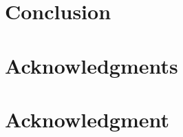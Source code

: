 \documentclass[conference,compsoc]{IEEEtran}
\begin{document}




\section{Conclusion}\label{sec:conclusion}







\ifCLASSOPTIONcompsoc
  \section*{Acknowledgments}
\else
  \section*{Acknowledgment}
\fi









%
%
%


%
%




\end{document}
